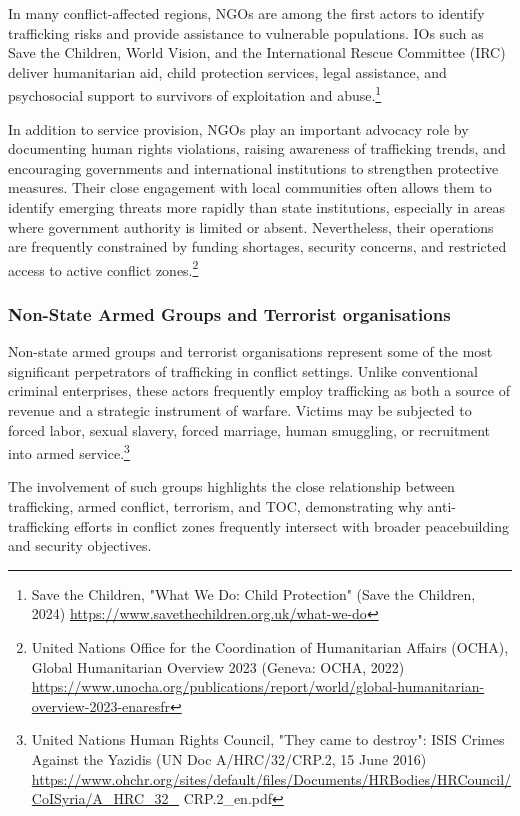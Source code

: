 In many conflict-affected regions, NGOs are among the first actors to identify trafficking risks and provide assistance to vulnerable populations. IOs such as Save the Children, World Vision, and the International Rescue Committee (IRC) deliver humanitarian aid, child protection services, legal assistance, and psychosocial support to survivors of exploitation and abuse.\footnote{Save the Children, "What We Do: Child Protection" (Save the Children, 2024) \url{https://www.savethechildren.org.uk/what-we-do}}

In addition to service provision, NGOs play an important advocacy role by documenting human rights violations, raising awareness of trafficking trends, and encouraging governments and international institutions to strengthen protective measures. Their close engagement with local communities often allows them to identify emerging threats more rapidly than state institutions, especially in areas where government authority is limited or absent. Nevertheless, their operations are frequently constrained by funding shortages, security concerns, and restricted access to active conflict zones.\footnote{United Nations Office for the Coordination of Humanitarian Affairs (OCHA), Global Humanitarian Overview 2023 (Geneva: OCHA, 2022) \url{https://www.unocha.org/publications/report/world/global-humanitarian-overview-2023-enaresfr}}

\subsubsection{Non-State Armed Groups and Terrorist organisations}

Non-state armed groups and terrorist organisations represent some of the most significant perpetrators of trafficking in conflict settings. Unlike conventional criminal enterprises, these actors frequently employ trafficking as both a source of revenue and a strategic instrument of warfare. Victims may be subjected to forced labor, sexual slavery, forced marriage, human smuggling, or recruitment into armed service.\footnote{United Nations Human Rights Council, "They came to destroy": ISIS Crimes Against the Yazidis (UN Doc A/HRC/32/CRP.2, 15 June 2016) \url{https://www.ohchr.org/sites/default/files/Documents/HRBodies/HRCouncil/CoISyria/A_HRC_32_} CRP.2\_en.pdf}

The involvement of such groups highlights the close relationship between trafficking, armed conflict, terrorism, and TOC, demonstrating why anti-trafficking efforts in conflict zones frequently intersect with broader peacebuilding and security objectives.


